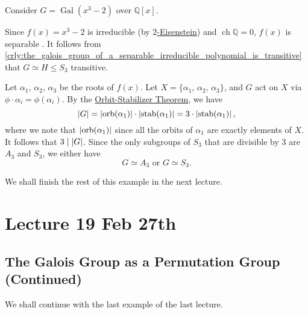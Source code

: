 \documentclass[notoc,notitlepage,nobib]{tufte-book}
\DeclareMathOperator{\Gal}{Gal}
\DeclareMathOperator{\stab}{stab}
\DeclareMathOperator{\orb}{orb}
\DeclareMathOperator{\ch}{ch}
\begin{document}
\begin{eg}
  Consider $G = \Gal(x^3 - 2)$ over $\mathbb{Q}[x]$.

  Since $f(x) = x^3 - 2$ is irreducible (by
  \hyperref[propo:eisenstein_s_criterion]{$2$-Eisenstein}) and $\ch \mathbb{Q} =
  0$, $f(x)$ is separable . It follows from
  \cref{crly:the_galois_group_of_a_separable_irreducible_polynomial_is_transitive}
  that $G \simeq H \leq S_3$ transitive.

  Let $\alpha_1, \, \alpha_2, \, \alpha_3$ be the roots of $f(x)$. Let $X = \{
  \alpha_1, \, \alpha_2, \, \alpha_3 \}$, and $G$ act on $X$ via $\phi \cdot
  \alpha_i = \phi(\alpha_i)$. By the
  \hyperref[thm:orbit_stabilizer_theorem]{Orbit-Stabilizer Theorem}, we have
  \begin{equation*}
    \abs{ G } = \abs{ \orb(\alpha_1) } \cdot \abs{ \stab(\alpha_1) } = 3 \cdot
    \abs{ \stab(\alpha_1) },
  \end{equation*}
  where we note that $\abs{ \orb(\alpha_1) }$ since all the orbits of $\alpha_1$
  are exactly elements of $X$. It follows that $3 \mid \left|G\right|$. Since the only
  subgroups of $S_3$ that are divisible by $3$ are $A_3$ and $S_3$, we either
  have
  \begin{equation*}
    G \simeq A_3 \text{ or } G \simeq S_3.
  \end{equation*}

\end{eg}

We shall finish the rest of this example in the next lecture.



\chapter{Lecture 19 Feb 27th}%
\label{chp:lecture_19_feb_27th}

\section{The Galois Group as a Permutation Group (Continued)}%
\label{sec:the_galois_group_as_a_permutation_group_continued}

We shall continue with the last example of the last lecture.
\end{document}

